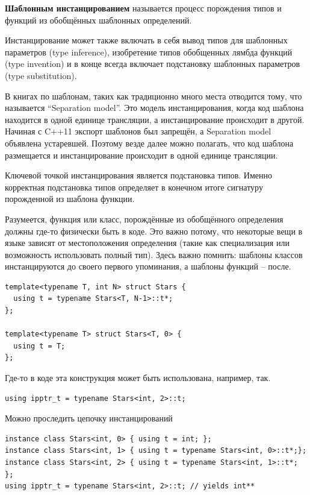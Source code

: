 \documentclass[a4paper,12pt,oneside]{article}
\begin{document}
\textbf{Шаблонным инстанцированием} называется процесс порождения типов и функций из обобщённых шаблонных определений.

Инстанцирование может также включать в себя вывод типов для шаблонных параметров (type inference), изобретение типов обобщенных лямбда функций (type invention) и в конце всегда включает подстановку шаблонных параметров (type substitution).

В книгах по шаблонам, таких как \cite{vandervoord} традиционно много места отводится тому, что называется ``Separation model''. Это модель инстанцирования, когда код шаблона находится в одной единице трансляции, а инстанцирование происходит в другой. Начиная с C++11 экспорт шаблонов был запрещён, а Separation model объявлена устаревшей. Поэтому везде далее можно полагать, что код шаблона размещается и инстанцирование происходит в одной единице трансляции.

Ключевой точкой инстанцирования является подстановка типов. Именно корректная подстановка типов определяет в конечном итоге сигнатуру порожденной из шаблона функции.

Разумеется, функция или класс, порождённые из обобщённого определения должны где-то физически быть в коде. Это важно потому, что некоторые вещи в языке зависят от местоположения определения (такие как специализация или возможность использовать полный тип). Здесь важно помнить: шаблоны классов инстанцируются до своего первого упоминания, а шаблоны функций -- после.

\begin{lstlisting}
template<typename T, int N> struct Stars {
  using t = typename Stars<T, N-1>::t*;
};

template<typename T> struct Stars<T, 0> {
  using t = T;
};
\end{lstlisting}

Где-то в коде эта конструкция может быть использована, например, так.

\begin{lstlisting}
using ipptr_t = typename Stars<int, 2>::t;
\end{lstlisting}

Можно проследить цепочку инстанцирований

\begin{lstlisting}
instance class Stars<int, 0> { using t = int; };
instance class Stars<int, 1> { using t = typename Stars<int, 0>::t*;}; 
instance class Stars<int, 2> { using t = typename Stars<int, 1>::t*; };
using ipptr_t = typename Stars<int, 2>::t; // yields int**
\end{lstlisting}
\end{document}
